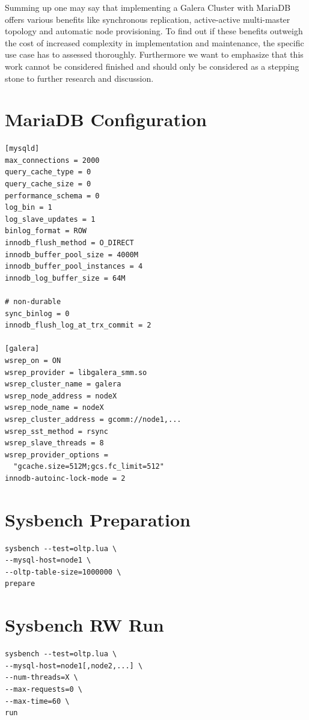 \documentclass{sig-alternate}
\begin{document}
Summing up one may say that implementing a Galera Cluster with MariaDB offers various benefits like synchronous replication, active-active multi-master topology and automatic node provisioning. To find out if these benefits outweigh the cost of increased complexity in implementation and maintenance, the specific use case has to assessed thoroughly. Furthermore we want to emphasize that this work cannot be considered finished and should only be considered as a stepping stone to further research and discussion.

\sloppy
\printbibliography

\appendix
\section{MariaDB Configuration}
\begin{verbatim}
[mysqld]
max_connections = 2000
query_cache_type = 0
query_cache_size = 0
performance_schema = 0
log_bin = 1
log_slave_updates = 1
binlog_format = ROW
innodb_flush_method = O_DIRECT
innodb_buffer_pool_size = 4000M
innodb_buffer_pool_instances = 4
innodb_log_buffer_size = 64M

# non-durable
sync_binlog = 0
innodb_flush_log_at_trx_commit = 2

[galera]
wsrep_on = ON
wsrep_provider = libgalera_smm.so
wsrep_cluster_name = galera
wsrep_node_address = nodeX
wsrep_node_name = nodeX
wsrep_cluster_address = gcomm://node1,...
wsrep_sst_method = rsync
wsrep_slave_threads = 8
wsrep_provider_options =
  "gcache.size=512M;gcs.fc_limit=512"
innodb-autoinc-lock-mode = 2
\end{verbatim}

\section{Sysbench Preparation}
\begin{verbatim}
sysbench --test=oltp.lua \
--mysql-host=node1 \
--oltp-table-size=1000000 \
prepare
\end{verbatim}

\section{Sysbench RW Run}
\begin{verbatim}
sysbench --test=oltp.lua \
--mysql-host=node1[,node2,...] \
--num-threads=X \
--max-requests=0 \
--max-time=60 \
run
\end{verbatim}
\end{document}
